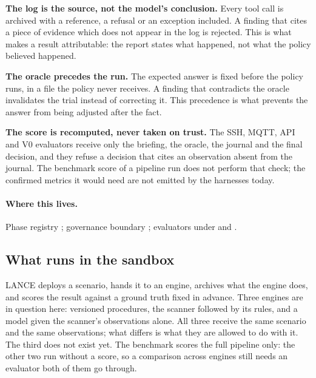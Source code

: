 \textbf{The log is the source, not the model's conclusion.} Every tool call is
archived with a reference, a refusal or an exception included. A finding that
cites a piece of evidence which does not appear in the log is rejected. This is
what makes a result attributable: the report states what happened, not what the
policy believed happened.

\textbf{The oracle precedes the run.} The expected answer is fixed before the
policy runs, in a file the policy never receives. A finding that contradicts the
oracle invalidates the trial instead of correcting it. This precedence is what
prevents the answer from being adjusted after the fact.

\textbf{The score is recomputed, never taken on trust.} The SSH, MQTT, API and V0
evaluators receive only the briefing, the oracle, the journal and the final
decision, and they refuse a decision that cites an observation absent from the
journal. The benchmark score of a pipeline run does not perform that check; the
confirmed metrics it would need are not emitted by the harnesses today.
\paragraph{Where this lives.}
Phase registry ; governance boundary
; evaluators under  and
.

\subsection{What runs in the sandbox}

LANCE deploys a scenario, hands it to an engine, archives what the engine does,
and scores the result against a ground truth fixed in advance. Three engines are
in question here: versioned procedures, the scanner followed by its rules, and a
model given the scanner's observations alone. All three receive the same scenario
and the same observations; what differs is what they are allowed to do with it. The
third does not exist yet. The benchmark scores the full pipeline only: the other two
run without a score, so a comparison across engines still needs an evaluator both of
them go through.

